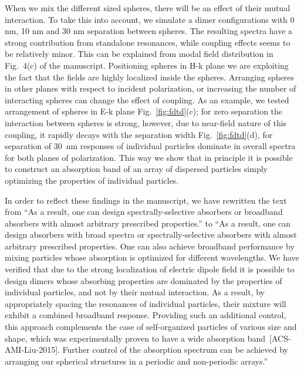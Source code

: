 \documentclass[a4paper]{article}
\begin{document}
When we mix the different sized spheres, there will be an effect of
their mutual interaction. To take this into account, we simulate a
dimer configurations with 0 nm, 10 nm and 30 nm separation between
spheres.  The resulting spectra have a strong contribution from
standalone resonances, while coupling effects seems to be relatively
minor. This can be explained from modal field distribution in
Fig.~4(c) of the manuscript. Positioning spheres in H-k plane we are
exploiting the fact that the fields are highly localized inside the
spheres. Arranging spheres in other planes with respect to incident
polarization, or increasing the number of interacting spheres can
change the effect of coupling. As an example, we tested arrangement of
spheres in E-k plane Fig.~\ref{fig:fdtd}(c); for zero separation the
interaction between spheres is strong, however, due to near-field
nature of this coupling, it rapidly decays with the separation width
Fig.~\ref{fig:fdtd}(d), for separation of 30~nm responses of
individual particles dominate in overall spectra for both planes of
polarization. This way we show that in principle it is possible to
construct an absorption band of an array of dispersed particles simply
optimizing the properties of individual particles.

In order to reflect these findings in the manuscript, we have
rewritten the text from ``As a result, one can design
spectrally-selective absorbers or broadband absorbers with almost
arbitrary prescribed properties.'' to ``As a result, one can design
absorbers with broad spectra or spectrally-selective absorbers with
almost arbitrary prescribed properties.  One can also achieve
broadband performance by mixing particles whose absorption is
optimized for different wavelengths. We have verified that due to the
strong localization of electric dipole field it is possible to design
dimers whose absorbing properties are dominated by the properties of
individual particles, and not by their mutual interaction. As a
result, by appropriately spacing the resonances of individual
particles, their mixture will exhibit a combined broadband
response. Providing such an additional control, this approach
complements the case of self-organized particles of various size and
shape, which was experimentally proven to have a wide absorption
band~[ACS-AMI-Liu-2015]. %
Further control of the absorption spectrum can be achieved by
arranging our spherical structures in a periodic and non-periodic
arrays.''
\end{document}
